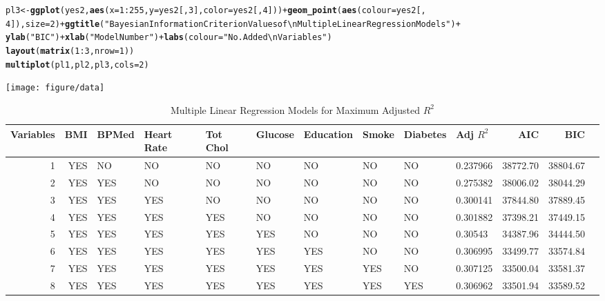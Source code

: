 \documentclass{article}\usepackage[]{graphicx}\usepackage[]{color}
\makeatletter
\def\maxwidth{ %
  \ifdim\Gin@nat@width>\linewidth
    \linewidth
  \else
    \Gin@nat@width
  \fi
}
\newcommand{\hlnum}[1]{\textcolor[rgb]{0.686,0.059,0.569}{#1}}%
\newcommand{\hlstr}[1]{\textcolor[rgb]{0.192,0.494,0.8}{#1}}%
\newcommand{\hlopt}[1]{\textcolor[rgb]{0,0,0}{#1}}%
\newcommand{\hlstd}[1]{\textcolor[rgb]{0.345,0.345,0.345}{#1}}%
\newcommand{\hlkwb}[1]{\textcolor[rgb]{0.69,0.353,0.396}{#1}}%
\newcommand{\hlkwc}[1]{\textcolor[rgb]{0.333,0.667,0.333}{#1}}%
\newcommand{\hlkwd}[1]{\textcolor[rgb]{0.737,0.353,0.396}{\textbf{#1}}}%
\newenvironment{kframe}{%
 \def\at@end@of@kframe{}%
 \ifinner\ifhmode%
  \def\at@end@of@kframe{\end{minipage}}%
  \begin{minipage}{\columnwidth}%
 \fi\fi%
 \def\FrameCommand##1{\hskip\@totalleftmargin \hskip-\fboxsep
 \colorbox{shadecolor}{##1}\hskip-\fboxsep
     \hskip-\linewidth \hskip-\@totalleftmargin \hskip\columnwidth}%
 \MakeFramed {\advance\hsize-\width
   \@totalleftmargin\z@ \linewidth\hsize
   \@setminipage}}%
 {\par\unskip\endMakeFramed%
 \at@end@of@kframe}
\newenvironment{knitrout}{}{} %
\makeatother
\begin{document}
\begin{knitrout}
\begin{kframe}
\begin{alltt}
\hlstd{pl3} \hlkwb{<-} \hlkwd{ggplot}\hlstd{(yes2,} \hlkwd{aes}\hlstd{(}\hlkwc{x} \hlstd{=} \hlnum{1}\hlopt{:}\hlnum{255}\hlstd{,} \hlkwc{y} \hlstd{= yes2[,} \hlnum{3}\hlstd{],} \hlkwc{color} \hlstd{= yes2[,} \hlnum{4}\hlstd{]))} \hlopt{+} \hlkwd{geom_point}\hlstd{(}\hlkwd{aes}\hlstd{(}\hlkwc{colour} \hlstd{= yes2[,}
    \hlnum{4}\hlstd{]),} \hlkwc{size} \hlstd{=} \hlnum{2}\hlstd{)} \hlopt{+} \hlkwd{ggtitle}\hlstd{(}\hlstr{"Bayesian Information Criterion Values of \textbackslash{}n Multiple Linear Regression Models"}\hlstd{)} \hlopt{+}
    \hlkwd{ylab}\hlstd{(}\hlstr{"BIC"}\hlstd{)} \hlopt{+} \hlkwd{xlab}\hlstd{(}\hlstr{"Model Number"}\hlstd{)} \hlopt{+} \hlkwd{labs}\hlstd{(}\hlkwc{colour} \hlstd{=} \hlstr{"No. Added \textbackslash{}n Variables"}\hlstd{)}
\hlkwd{layout}\hlstd{(}\hlkwd{matrix}\hlstd{(}\hlnum{1}\hlopt{:}\hlnum{3}\hlstd{,} \hlkwc{nrow} \hlstd{=} \hlnum{1}\hlstd{))}
\hlkwd{multiplot}\hlstd{(pl1, pl2, pl3,} \hlkwc{cols} \hlstd{=} \hlnum{2}\hlstd{)}
\end{alltt}


{\ttfamily\noindent\itshape\color{messagecolor}{\#\# Loading required package: grid}}\end{kframe}
\texttt{[image: figure/data]} 

\end{knitrout}


\begin{table}[ht]
\begin{scriptsize}
\centering
\begin{tabular}{rrllllllllrrr}
  \hline
Variables & BMI & BPMed & Heart Rate & Tot Chol & Glucose & Education & Smoke & Diabetes & Adj $R^2$ & AIC & BIC \\ 
  \hline
        1 & YES & NO & NO & NO & NO & NO & NO & NO & 0.237966 & 38772.70 & 38804.67 \\ 
     2 & YES & YES & NO & NO & NO & NO & NO & NO & 0.275382 & 38006.02 & 38044.29 \\ 
     3 & YES & YES & YES & NO & NO & NO & NO & NO & 0.300141 & 37844.80 & 37889.45 \\ 
     4 & YES & YES & YES & YES & NO & NO & NO & NO & 0.301882 & 37398.21 & 37449.15 \\ 
     5 & YES & YES & YES & YES & YES & NO & NO & NO & 0.30543 & 34387.96 & 34444.50 \\ 
     6 & YES & YES & YES & YES & YES & YES & NO & NO & 0.306995 & 33499.77 & 33574.84 \\ 
     7 & YES & YES & YES & YES & YES & YES & YES & NO & 0.307125 & 33500.04 & 33581.37 \\ 
     8 & YES & YES & YES & YES & YES & YES & YES & YES & 0.306962 & 33501.94 & 33589.52 \\  
   \hline
   \end{tabular}
\caption{Multiple Linear Regression Models for Maximum Adjusted $R^2$}
\end{scriptsize}
\end{table}
\end{document}
